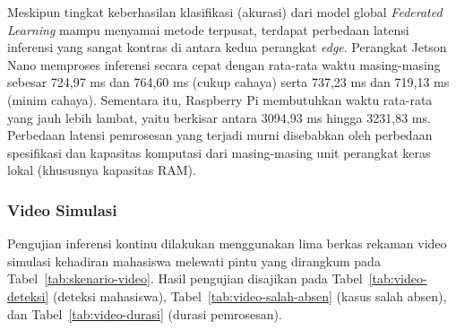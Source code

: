 \documentclass[conference]{IEEEtran}
\begin{document}
\begin{table}[H]
\caption{Hasil Pengujian Latensi Inferensi (Minim Cahaya: 47,54 lux)}
\begin{center}
\label{tab:latensi-minim}
\end{center}
\end{table}

Meskipun tingkat keberhasilan klasifikasi (akurasi) dari model global \textit{Federated Learning} mampu menyamai metode terpusat, terdapat perbedaan latensi inferensi yang sangat kontras di antara kedua perangkat \textit{edge}. Perangkat Jetson Nano memproses inferensi secara cepat dengan rata-rata waktu masing-masing sebesar 724,97 ms dan 764,60 ms (cukup cahaya) serta 737,23 ms dan 719,13 ms (minim cahaya). Sementara itu, Raspberry Pi membutuhkan waktu rata-rata yang jauh lebih lambat, yaitu berkisar antara 3094,93 ms hingga 3231,83 ms. Perbedaan latensi pemrosesan yang terjadi murni disebabkan oleh perbedaan spesifikasi dan kapasitas komputasi dari masing-masing unit perangkat keras lokal (khususnya kapasitas RAM).

\subsubsection{Video Simulasi}
Pengujian inferensi kontinu dilakukan menggunakan lima berkas rekaman video simulasi kehadiran mahasiswa melewati pintu yang dirangkum pada Tabel~\ref{tab:skenario-video}. Hasil pengujian disajikan pada Tabel~\ref{tab:video-deteksi} (deteksi mahasiswa), Tabel~\ref{tab:video-salah-absen} (kasus salah absen), dan Tabel~\ref{tab:video-durasi} (durasi pemrosesan).
\end{document}

